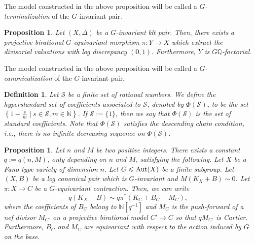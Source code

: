 \documentclass{amsart}
\renewcommand{\qq}{\mathbb{Q}}
\newcommand{\nn}{\mathbb{N}}
\newtheorem{proposition}[theorem]{Proposition}
\newtheorem{definition}[theorem]{Definition}
\theoremstyle{remark}
\numberwithin{equation}{section}
\begin{document}
The model constructed in the above proposition will be called a {\em $G$-terminalization} of the $G$-invariant pair.

\begin{proposition}\label{prop:existence-g-can}
Let $(X,\Delta)$ be a $G$-invariant klt pair.
Then, there exists a projective birational $G$-equivariant morphism 
$\pi\colon Y\rightarrow X$ which extract the divisorial valuations
with log discrepancy $(0,1)$.
Furthermore, $Y$ is $G\qq$-factorial.
\end{proposition} 

The model constructed in the above proposition will be called a {\em 
$G$-canonicalization} of the $G$-invariant pair. 

\begin{definition}\label{def:hyperstandard}
{\em 
Let $\mathcal{S}$ be a finite set of rational numbers.
We define the {\em hyperstandard set of coefficients} associated to $\mathcal{S}$, denoted by $\Phi(\mathcal{S})$, to be the set
$\left\{ 1-\frac{s}{m} \mid s\in \mathcal{S}, m\in \mathbb{N}\right\}$.
If $\mathcal{S}:=\{1\}$, then we say that $\Phi(\mathcal{S})$ is the set of standard coefficients.
Note that $\Phi(\mathcal{S})$ satisfies the descending chain condition, i.e., 
there is no infinite decreasing sequence on $\Phi(\mathcal{S})$.
}
\end{definition}

\begin{proposition}\label{prop:g-equiv-cbf}
Let $n$ and $M$ be two positive integers.
There exists a constant $q:=q(n,M)$, only depending on $n$ and $M$,
satisfying the following.
Let $X$ be a Fano type variety of dimension $n$.
Let $G\leqslant {\rm Aut}(X)$ be a finite subgroup.
Let $(X,B)$ be a log canonical pair which is $G$-invariant
and $M(K_X+B)\sim 0$.
Let $\pi\colon X\rightarrow C$ be a $G$-equivariant contraction.
Then, we can write
\[
q(K_X+B) \sim q\pi^*(K_C+B_C+M_C),
\]
where the coefficients of $B_C$ belong to $\nn\left[q^{-1}\right]$
and $M_C$ is the push-forward of a nef divisor $M_{C'}$ on a projective birational model $C'\rightarrow C$ so that $qM_{C'}$ is Cartier.
Furthermore, $B_C$ and $M_C$ are equivariant with respect to the action induced by $G$ on the base.
\end{proposition}
\end{document}
